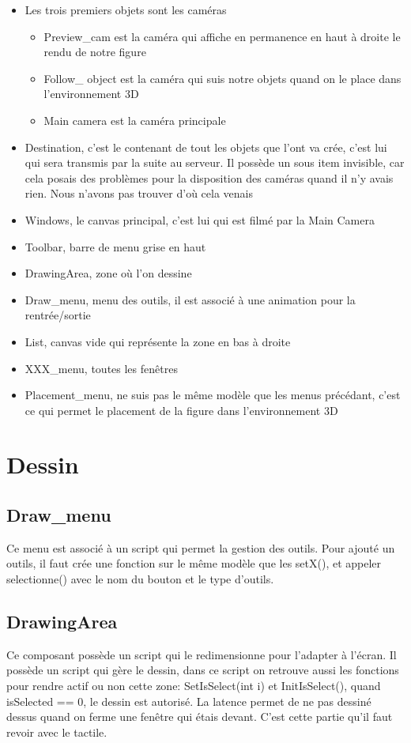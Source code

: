 \documentclass[a4paper,11pt]{article}
\begin{document}
		\begin{itemize}
			\item Les trois premiers objets sont les caméras
				\begin{itemize}
					\item Preview\_cam est la caméra qui affiche en permanence en haut à droite le rendu de notre figure
					\item Follow\_ object est la caméra qui suis notre objets quand on le place dans l'environnement 3D
					\item Main camera est la caméra principale
				\end{itemize}
			\item Destination, c'est le contenant de tout les objets que l'ont va crée, c'est lui qui sera transmis par la suite au serveur. Il possède un sous item invisible, car cela posais des problèmes pour la disposition des caméras quand il n'y avais rien. Nous n'avons pas trouver d'où cela venais
			\item Windows, le canvas principal, c'est lui qui est filmé par la Main Camera
			\item Toolbar, barre de menu grise en haut
			\item DrawingArea, zone où l'on dessine
			\item Draw\_menu, menu des outils, il est associé à une animation pour la rentrée/sortie
			\item List, canvas vide qui représente la zone en bas à droite
			\item XXX\_menu, toutes les fenêtres
			\item Placement\_menu, ne suis pas le même modèle que les menus précédant, c'est ce qui permet le placement de la figure dans l'environnement 3D
		\end{itemize}
\section{Dessin}
	\subsection{Draw\_menu}	
		Ce menu est associé à un script	qui permet la gestion des outils. Pour ajouté un outils, il faut crée une fonction sur le même modèle que les setX(), et appeler selectionne() avec le nom du bouton et le type d'outils. 
	\subsection{DrawingArea}
		Ce composant possède un script qui le redimensionne pour l'adapter à l'écran.
		Il possède un script qui gère le dessin, dans ce script on retrouve aussi les fonctions pour rendre actif ou non cette zone: SetIsSelect(int i) et InitIsSelect(), quand isSelected == 0, le dessin est autorisé. La latence permet de ne pas dessiné dessus quand on ferme une fenêtre qui étais devant. C'est cette partie qu'il faut revoir avec le tactile.
		
\end{document}
